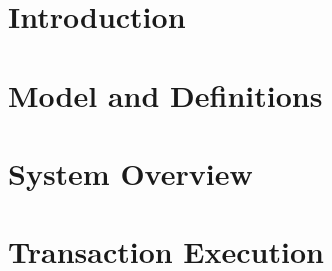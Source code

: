 \documentclass[letterpaper,twocolumn,10pt]{article}
\begin{document}
\section{Introduction} 


%

%
%
%
%
 
%
%

\section{Model and Definitions}
\label{section:model}

%





\section{System Overview}
\label{section:arch}



%
%



%


\section{Transaction Execution}
\label{section:exec}

%
%
%
%
\end{document}
